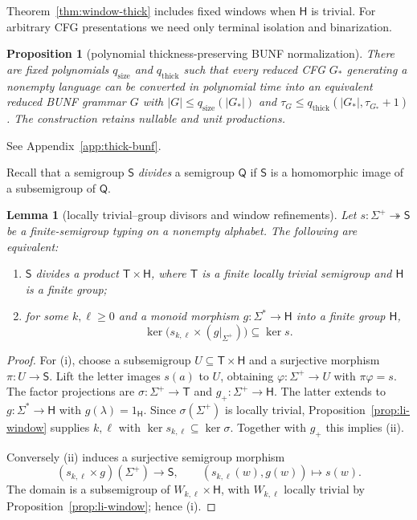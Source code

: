 \documentclass[11pt,a4paper]{article}
\newtheorem{lemma}[theorem]{Lemma}
\newtheorem{proposition}[theorem]{Proposition}
\theoremstyle{remark}
\theoremstyle{plain}
\begin{document}
Theorem~\ref{thm:window-thick} includes fixed windows
when $\mathsf H$ is trivial. For arbitrary CFG presentations
we need only terminal isolation and binarization.

\begin{proposition}[polynomial thickness-preserving BUNF normalization]
\label{prop:thick-bunf-normal}
There are fixed polynomials $q_{\mathrm{size}}$ and
$q_{\mathrm{thick}}$ such that every reduced CFG $G_*$
generating a nonempty language can be converted in
polynomial time into an equivalent reduced BUNF grammar $G$
with
$|G|\le q_{\mathrm{size}}(|G_*|)$ and
$\tau_G\le q_{\mathrm{thick}}(|G_*|,\tau_{G_*}+1)$.
The construction retains nullable and unit productions.
\end{proposition}
See Appendix~\ref{app:thick-bunf}.

Recall that a semigroup $\mathsf S$ \emph{divides} a semigroup $\mathsf Q$
if $\mathsf S$ is a homomorphic image of a subsemigroup of $\mathsf Q$.

\begin{lemma}[locally trivial--group divisors and window refinements]
\label{lem:li-group-factor}
Let $s:\Sigma^+\twoheadrightarrow\mathsf S$
be a finite-semigroup typing on a nonempty alphabet.
The following are equivalent:
\begin{enumerate}[label=\textup{(\roman*)},nosep]
\item $\mathsf S$ divides a product $\mathsf T\times\mathsf H$,
where $\mathsf T$ is a finite locally trivial semigroup
and $\mathsf H$ is a finite group;
\item for some $k,\ell\ge0$ and a monoid morphism
$g:\Sigma^*\to\mathsf H$ into a finite group $\mathsf H$,
\[
\ker\bigl(s_{k,\ell}\times(g|_{\Sigma^+})\bigr)
\subseteq\ker s.
\]
\end{enumerate}
\end{lemma}
\begin{proof}
For (i), choose a subsemigroup
$U\subseteq\mathsf T\times\mathsf H$ and a surjective
morphism $\pi:U\to\mathsf S$. Lift the letter images
$s(a)$ to $U$, obtaining $\varphi:\Sigma^+\to U$
with $\pi\varphi=s$. The factor projections are
$\sigma:\Sigma^+\to\mathsf T$ and
$g_+:\Sigma^+\to\mathsf H$. The latter extends
to $g:\Sigma^*\to\mathsf H$ with
$g(\lambda)=1_{\mathsf H}$. Since
$\sigma(\Sigma^+)$ is locally trivial,
Proposition~\ref{prop:li-window} supplies
$k,\ell$ with $\ker s_{k,\ell}\subseteq\ker\sigma$.
Together with $g_+$ this implies (ii).

Conversely (ii) induces a surjective semigroup morphism
\[
(s_{k,\ell}\times g)(\Sigma^+)\longrightarrow\mathsf S,
\qquad(s_{k,\ell}(w),g(w))\longmapsto s(w).
\]
The domain is a subsemigroup of
$W_{k,\ell}\times\mathsf H$, with $W_{k,\ell}$
locally trivial by Proposition~\ref{prop:li-window};
hence (i).
\end{proof}
\end{document}
